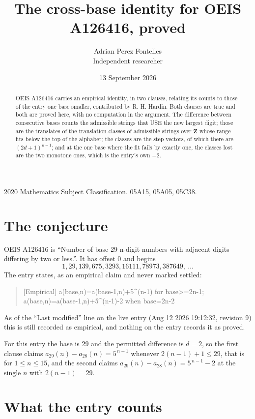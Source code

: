 \documentclass[11pt,a4paper]{article}
\title{The cross-base identity for OEIS A126416, proved}
\author{Adrian Perez Fontelles\\ \small Independent researcher}
\date{13 September 2026}
\theoremstyle{plain}
\theoremstyle{definition}
\begin{document}
\maketitle

\begin{abstract}
OEIS A126416 carries an empirical identity, in two clauses, relating its counts to those of the
entry one base smaller, contributed by R. H. Hardin. Both clauses are true and both are proved
here, with no computation in the argument. The difference between consecutive bases counts the
admissible strings that USE the new largest digit; those are the translates of the
translation-classes of admissible strings over $\mathbf{Z}$ whose range fits below the top of
the alphabet; the classes are the step vectors, of which there are $(2d+1)^{n-1}$; and at the
one base where the fit fails by exactly one, the classes lost are the two monotone ones, which
is the entry's own $-2$.
\end{abstract}

\noindent\small 2020 Mathematics Subject Classification. 05A15, 05A05, 05C38.\normalsize

\section{The conjecture}

OEIS A126416 is ``Number of base 29 n-digit numbers with adjacent digits differing by two or less.''. It has offset $0$ and begins
\[
1, 29, 139, 675, 3293, 16111, 78973, 387649,\ \dots
\]
The entry states, as an empirical claim and never marked settled:
\begin{quote}
[Empirical] a(base,n)=a(base-1,n)+5\textasciicircum{}(n-1) for base>=2n-1; a(base,n)=a(base-1,n)+5\textasciicircum{}(n-1)-2 when base=2n-2
\end{quote}
As of the ``Last modified'' line on the live entry (Aug 12 2026 19:12:32, revision 9)
this is still recorded as empirical, and nothing on the entry records it as proved.

For this entry the base is $29$ and the permitted difference is $d=2$, so the first clause
claims $a_{29}(n)-a_{28}(n)=5^{\,n-1}$ whenever $2(n-1)+1\le29$, that is for
$1\le n\le15$, and the second claims $a_{29}(n)-a_{28}(n)=5^{\,n-1}-2$ at the single
$n$ with $2(n-1)=29$.

\section{What the entry counts}
\end{document}
